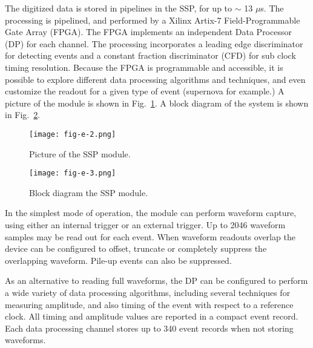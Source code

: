 The digitized data is stored in pipelines in the SSP, for up to $\sim$
13 $\mu$s.  The processing is pipelined, and performed by a Xilinx
Artix-7 Field-Programmable Gate Array (FPGA).  The FPGA implements an
independent Data Processor (DP) for each channel.  The processing
incorporates a leading edge discriminator for detecting events and a
constant fraction discriminator (CFD) for sub clock timing resolution.
Because the FPGA is programmable and accessible, it is possible to
explore different data processing algorithms and techniques, and even
customize the readout for a given type of event (supernova for
example.)  A picture of the module is shown in Fig.~\ref{fig:fig-e-2}.
A block diagram of the system is shown in Fig.~\ref{fig:fig-e-3}.
%
\begin{figure}[h]
  \centering
\texttt{[image: fig-e-2.png]}
\caption{Picture of the SSP module.}
\label{fig:fig-e-2}
\end{figure}
%
%
\begin{figure}[h]
  \centering
\texttt{[image: fig-e-3.png]}
\caption{Block diagram the SSP module.}
\label{fig:fig-e-3}
\end{figure}
%
In the simplest mode of operation, the module can perform waveform
capture, using either an internal trigger or an external trigger.  Up
to 2046 waveform samples may be read out for each event.  When
waveform readouts overlap the device can be configured to offset,
truncate or completely suppress the overlapping waveform.  Pile-up
events can also be suppressed.

As an alternative to reading full waveforms, the DP can be configured
to perform a wide variety of data processing algorithms, including
several techniques for measuring amplitude, and also timing of the
event with respect to a reference clock.  All timing and amplitude
values are reported in a compact event record.  Each data processing
channel stores up to 340 event records when not storing waveforms.

